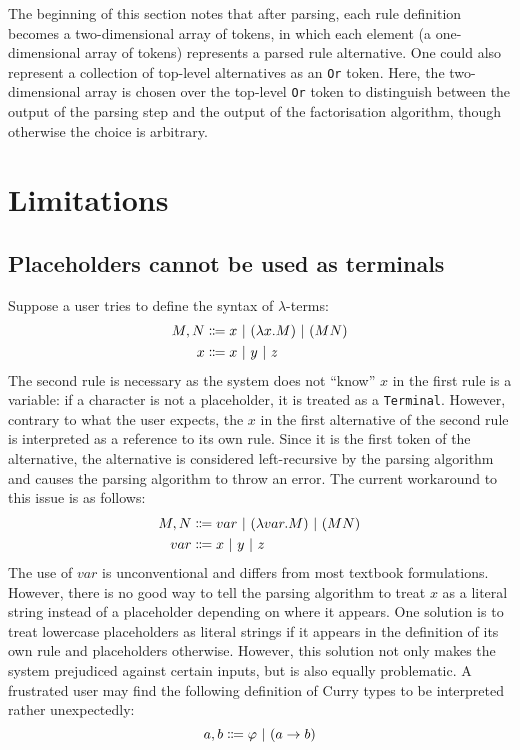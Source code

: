 The beginning of this section notes that after parsing, each rule definition becomes a two-dimensional array of tokens, in which each element (a one-dimensional array of tokens) represents a parsed rule alternative. One could also represent a collection of top-level alternatives as an \lstinline{Or} token. Here, the two-dimensional array is chosen over the top-level \lstinline{Or} token to distinguish between the output of the parsing step and the output of the factorisation algorithm, though otherwise the choice is arbitrary.

\section{Limitations}
\subsection{Placeholders cannot be used as terminals}
Suppose a user tries to define the syntax of $\lambda$-terms:
\begin{align*}
    M, N &\Coloneqq x \ |\  (\lambda x. M) \ |\  (MN) \\
    x &\Coloneqq x \ |\  y \ |\  z
\end{align*}
The second rule is necessary as the system does not ``know'' $x$ in the first rule is a variable: if a character is not a placeholder, it is treated as a \lstinline{Terminal}. However, contrary to what the user expects, the $x$ in the first alternative of the second rule is interpreted as a reference to its own rule. Since it is the first token of the alternative, the alternative is considered left-recursive by the parsing algorithm and causes the parsing algorithm to throw an error. The current workaround to this issue is as follows:
\begin{align*}
    M, N &\Coloneqq var \ |\  (\lambda var. M) \ |\  (MN) \\
    var &\Coloneqq x \ |\  y \ |\  z
\end{align*}
The use of $var$ is unconventional and differs from most textbook formulations. However, there is no good way to tell the parsing algorithm to treat $x$ as a literal string instead of a placeholder depending on where it appears. One solution is to treat lowercase placeholders as literal strings if it appears in the definition of its own rule and placeholders otherwise. However, this solution not only makes the system prejudiced against certain inputs, but is also equally problematic. A frustrated user may find the following definition of Curry types to be interpreted rather unexpectedly:
\[
  a, b \Coloneqq \varphi \ |\  (a \to b)
\]